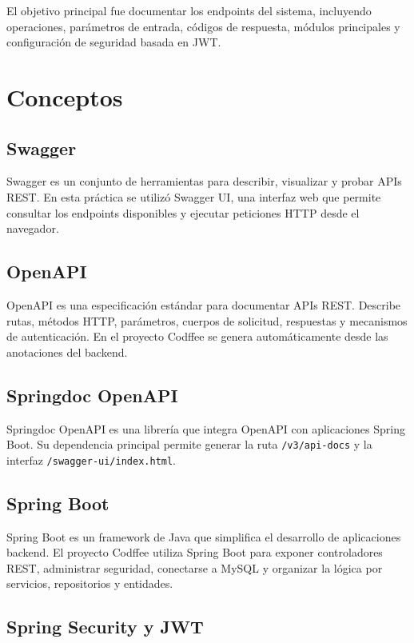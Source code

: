 \documentclass[10pt,a4paper]{article}
\newcommand{\cod}[1]{\texttt{\scriptsize #1}}
\begin{document}
El objetivo principal fue documentar los endpoints del sistema, incluyendo operaciones, parámetros de entrada, códigos de respuesta, módulos principales y configuración de seguridad basada en JWT.

\section{Conceptos}

\subsection{Swagger}

Swagger es un conjunto de herramientas para describir, visualizar y probar APIs REST. En esta práctica se utilizó Swagger UI, una interfaz web que permite consultar los endpoints disponibles y ejecutar peticiones HTTP desde el navegador.

\subsection{OpenAPI}

OpenAPI es una especificación estándar para documentar APIs REST. Describe rutas, métodos HTTP, parámetros, cuerpos de solicitud, respuestas y mecanismos de autenticación. En el proyecto Codffee se genera automáticamente desde las anotaciones del backend.

\subsection{Springdoc OpenAPI}

Springdoc OpenAPI es una librería que integra OpenAPI con aplicaciones Spring Boot. Su dependencia principal permite generar la ruta \cod{/v3/api-docs} y la interfaz \cod{/swagger-ui/index.html}.

\subsection{Spring Boot}

Spring Boot es un framework de Java que simplifica el desarrollo de aplicaciones backend. El proyecto Codffee utiliza Spring Boot para exponer controladores REST, administrar seguridad, conectarse a MySQL y organizar la lógica por servicios, repositorios y entidades.

\subsection{Spring Security y JWT}
\end{document}
